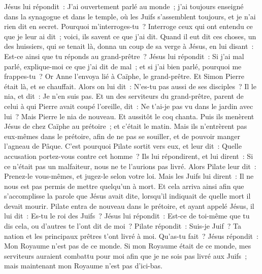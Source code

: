 \begin{multicols}{2}
Jésus lui répondit~: J'ai ouvertement parlé au monde~; j'ai toujours enseigné dans la synagogue et dans le temple, où les Juifs s'assemblent toujours, et je n'ai rien dit en secret.
Pourquoi m'interroges-tu~? Interroge ceux qui ont entendu ce que je leur ai dit~; voici, ils savent ce que j'ai dit.
Quand il eut dit ces choses, un des huissiers, qui se tenait là, donna un coup de sa verge à Jésus, en lui disant~: Est-ce ainsi que tu réponds au grand-prêtre~?
Jésus lui répondit~: Si j'ai mal parlé, explique-moi ce que j'ai dit de mal~; et si j'ai bien parlé, pourquoi me frappes-tu~?
Or Anne l'envoya lié à Caïphe, le grand-prêtre.
Et Simon Pierre était là, et se chauffait. Alors on lui dit~: N'es-tu pas aussi de ses disciples~? Il le nia, et dit~: Je n'en suis pas.
Et un des serviteurs du grand-prêtre, parent de celui à qui Pierre avait coupé l'oreille, dit~: Ne t'ai-je pas vu dans le jardin avec lui~?
Mais Pierre le nia de nouveau. Et aussitôt le coq chanta.
Puis ils menèrent Jésus de chez Caïphe au prétoire~; et c'était le matin. Mais ils n'entrèrent pas eux-mêmes dans le prétoire, afin de ne pas se souiller, et de pouvoir manger l'agneau de Pâque.
C'est pourquoi Pilate sortit vers eux, et leur dit~: Quelle accusation portez-vous contre cet homme~?
Ils lui répondirent, et lui dirent~: Si ce n'était pas un malfaiteur, nous ne te l'aurions pas livré.
Alors Pilate leur dit~: Prenez-le vous-mêmes, et jugez-le selon votre loi. Mais les Juifs lui dirent~: Il ne nous est pas permis de mettre quelqu'un à mort.
Et cela arriva ainsi afin que s'accomplisse la parole que Jésus avait dite, lorsqu'il indiquait de quelle mort il devait mourir.
Pilate entra de nouveau dans le prétoire, et ayant appelé Jésus, il lui dit~: Es-tu le roi des Juifs~?
Jésus lui répondit~: Est-ce de toi-même que tu dis cela, ou d'autres te l'ont dit de moi~?
Pilate répondit~: Suis-je Juif~? Ta nation et les principaux prêtres t'ont livré à moi. Qu'as-tu fait~?
Jésus répondit~: Mon Royaume n'est pas de ce monde. Si mon Royaume était de ce monde, mes serviteurs auraient combattu pour moi afin que je ne sois pas livré aux Juifs~; mais maintenant mon Royaume n'est pas d'ici-bas.

\end{multicols}
